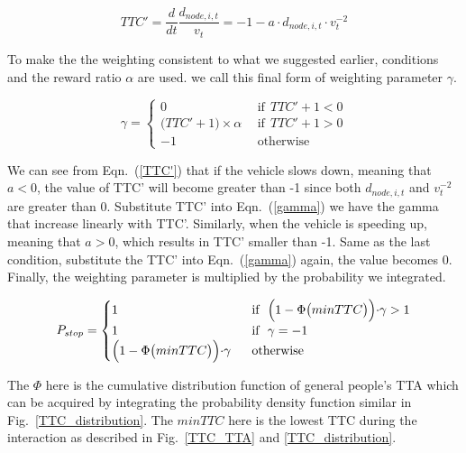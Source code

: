 \documentclass[twocolumn,10pt]{asme2e}
\begin{document}
\begin{equation}
TTC' = \frac{d}{dt}\frac{d_{node,i,t}}{v_t} = -1 -a \cdot d_{node,i,t} \cdot v_t^{-2}
\label{TTC'}
\end{equation}

To make the the weighting consistent to what we suggested earlier, conditions and the reward ratio $\alpha$ are used. we call this final form of weighting parameter $\gamma$.

\begin{equation}
    \gamma = 
    \begin{cases} 
     0 &~~\text{if}~~TTC' + 1<0\\
    \big(TTC' + 1\big)\times \alpha &~~\text{if}~~TTC' + 1>0\\
    -1 &~~\text{otherwise}
    \end{cases}
\label{gamma}
\end{equation}

We can see from Eqn.~(\ref{TTC'}) that if the vehicle slows down, meaning that $a<0$, the value of TTC' will become greater than -1 since both $d_{node,i,t}$ and $v_t^{-2}$ are greater than 0. Substitute TTC' into Eqn.~(\ref{gamma}) we have the gamma that increase linearly with TTC'. Similarly, when the vehicle is speeding up, meaning that $a>0$, which results in TTC' smaller than -1. Same as the last condition, substitute the TTC' into Eqn.~(\ref{gamma}) again, the value becomes 0. Finally, the weighting parameter is multiplied by the probability we integrated.

\begin{equation}
    P_{stop} = 
    \begin{cases} 
    1&~~\text{if}~~\Bigr(1-\Phi\big(min TTC\big)\Bigl) \cdot \gamma > 1\\
    1&~~\text{if}~~\gamma = -1\\
    \Bigr(1-\Phi\big(min TTC\big)\Bigl)\cdot \gamma &~~\text{otherwise}    
    \end{cases}
\label{p_stop}
\end{equation}

The $\Phi$ here is the cumulative distribution function of general people's TTA which can be acquired by integrating the probability density function similar in Fig.~\ref{TTC_distribution}. The $minTTC$ here is the lowest TTC during the interaction as described in Fig.~\ref{TTC_TTA} and \ref{TTC_distribution}.
\end{document}
